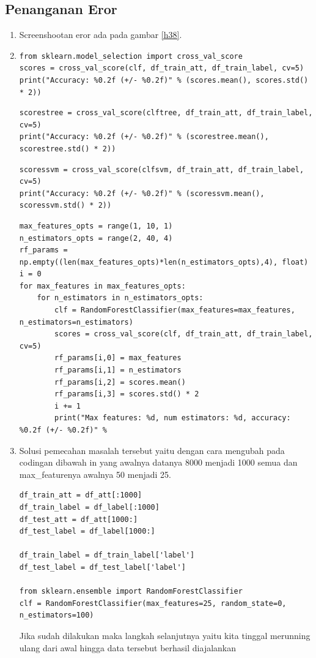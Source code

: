 \subsection{Penanganan Eror}
\begin{enumerate}
\item Screenshootan eror ada pada gambar \ref{h38}.
\item 
\begin{verbatim}
from sklearn.model_selection import cross_val_score
scores = cross_val_score(clf, df_train_att, df_train_label, cv=5)
print("Accuracy: %0.2f (+/- %0.2f)" % (scores.mean(), scores.std() * 2))
\end{verbatim}
\subitem 
\begin{verbatim}
scorestree = cross_val_score(clftree, df_train_att, df_train_label, cv=5)
print("Accuracy: %0.2f (+/- %0.2f)" % (scorestree.mean(), scorestree.std() * 2))
\end{verbatim}
\subitem 
\begin{verbatim}
scoressvm = cross_val_score(clfsvm, df_train_att, df_train_label, cv=5)
print("Accuracy: %0.2f (+/- %0.2f)" % (scoressvm.mean(), scoressvm.std() * 2))
\end{verbatim}
\subitem 
\begin{verbatim}
max_features_opts = range(1, 10, 1)
n_estimators_opts = range(2, 40, 4)
rf_params = np.empty((len(max_features_opts)*len(n_estimators_opts),4), float)
i = 0
for max_features in max_features_opts:
    for n_estimators in n_estimators_opts:
        clf = RandomForestClassifier(max_features=max_features, n_estimators=n_estimators)
        scores = cross_val_score(clf, df_train_att, df_train_label, cv=5)
        rf_params[i,0] = max_features
        rf_params[i,1] = n_estimators
        rf_params[i,2] = scores.mean()
        rf_params[i,3] = scores.std() * 2
        i += 1
        print("Max features: %d, num estimators: %d, accuracy: %0.2f (+/- %0.2f)" %
\end{verbatim}
\item Solusi pemecahan masalah tersebut yaitu dengan cara mengubah pada codingan dibawah in yang awalnya datanya 8000 menjadi 1000 semua dan max\_featurenya awalnya 50 menjadi 25.
\subitem 
\begin{verbatim}
df_train_att = df_att[:1000]
df_train_label = df_label[:1000]
df_test_att = df_att[1000:]
df_test_label = df_label[1000:]

df_train_label = df_train_label['label']
df_test_label = df_test_label['label']

from sklearn.ensemble import RandomForestClassifier
clf = RandomForestClassifier(max_features=25, random_state=0, n_estimators=100)
\end{verbatim}
\subitem Jika sudah dilakukan maka langkah selanjutnya yaitu kita tinggal merunning ulang dari awal hingga data tersebut berhasil diajalankan
\end{enumerate}

